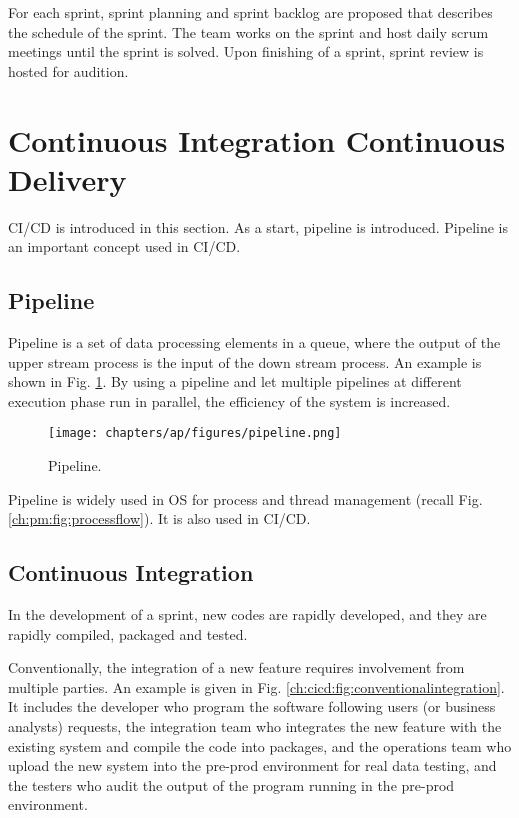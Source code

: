 For each sprint, sprint planning and sprint backlog are proposed that describes the schedule of the sprint. The team works on the sprint and host daily scrum meetings until the sprint is solved. Upon finishing of a sprint, sprint review is hosted for audition.

\section{Continuous Integration Continuous Delivery}

CI/CD is introduced in this section. As a start, pipeline is introduced. Pipeline is an important concept used in CI/CD.

\subsection{Pipeline}

Pipeline is a set of data processing elements in a queue, where the output of the upper stream process is the input of the down stream process. An example is shown in Fig. \ref{ch:cicd:fig:pipeline}. By using a pipeline and let multiple pipelines at different execution phase run in parallel, the efficiency of the system is increased.
\begin{figure}[htbp]
	\centering
	\texttt{[image: chapters/ap/figures/pipeline.png]}
	\caption{Pipeline.} \label{ch:cicd:fig:pipeline}
\end{figure}

Pipeline is widely used in OS for process and thread management (recall Fig. \ref{ch:pm:fig:processflow}). It is also used in CI/CD.

\subsection{Continuous Integration}

In the development of a sprint, new codes are rapidly developed, and they are rapidly compiled, packaged and tested.

Conventionally, the integration of a new feature requires involvement from multiple parties. An example is given in Fig. \ref{ch:cicd:fig:conventionalintegration}. It includes the developer who program the software following users (or business analysts) requests, the integration team who integrates the new feature with the existing system and compile the code into packages, and the operations team who upload the new system into the pre-prod environment for real data testing, and the testers who audit the output of the program running in the pre-prod environment.

